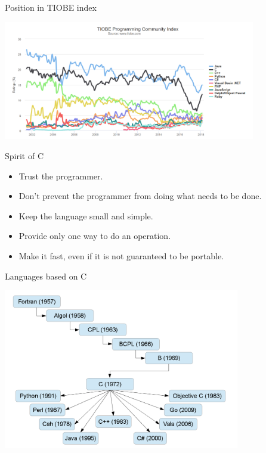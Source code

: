 \begin{frame}{Position in TIOBE index}
    \begin{center}
        \includegraphics[width=11cm]{tiobe_4.png}
    \end{center}
\end{frame}
\begin{frame}{Spirit of C}
    \begin{itemize}
        \item Trust the programmer.
        \pause \item Don’t prevent the programmer from doing what needs to be done.
        \pause \item Keep the language small and simple.
        \pause \item Provide only one way to do an operation.
        \pause \item Make it fast, even if it is not guaranteed to be portable.
    \end{itemize}
\end{frame}
\begin{frame}{Languages based on C}
    \begin{center}
        \includegraphics[height=7cm]{ctree.png}
    \end{center}
\end{frame}
